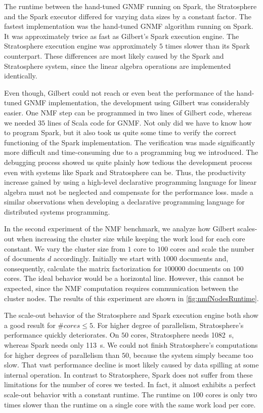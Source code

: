 The runtime between the hand-tuned GNMF running on Spark, the Stratosphere and the Spark executor differed for varying data sizes by a constant factor.
The fastest implementation was the hand-tuned GNMF algorithm running on Spark.
It was approximately twice as fast as Gilbert's Spark execution engine.
The Stratosphere execution engine was approximately $5$ times slower than its Spark counterpart.
These differences are most likely caused by the Spark and Stratosphere system, since the linear algebra operations are implemented identically.

Even though, Gilbert could not reach or even beat the performance of the hand-tuned GNMF implementation, the development using Gilbert was considerably easier.
One NMF step can be programmed in two lines of Gilbert code, whereas we needed $35$ lines of Scala code for GNMF.
Not only did we have to know how to program Spark, but it also took us quite some time to verify the correct functioning of the Spark implementation.
The verification was made significantly more difficult and time-consuming due to a programming bug we introduced.
The debugging process showed us quite plainly how tedious the development process even with systems like Spark and Stratosphere can be.
Thus, the productivity increase gained by using a high-level declarative programming language for linear algebra must not be neglected and compensate for the performance loss.
\Textcite{alvaro:2010a} made a similar observations when developing a declarative programming language for distributed systems programming.

In the second experiment of the NMF benchmark, we analyze how Gilbert scales-out when increasing the cluster size while keeping the work load for each core constant.
We vary the cluster size from $1$ core to $100$ cores and scale the number of documents $d$ accordingly.
Initially we start with $1000$ documents and, consequently, calculate the matrix factorization for $100000$ documents on $100$ cores.
The ideal behavior would be a horizontal line.
However, this cannot be expected, since the NMF computation requires communication between the cluster nodes.
The results of this experiment are shown in \cref{fig:nmfNodesRuntime}.

The scale-out behavior of the Stratosphere and Spark execution engine both show a good result for $\#cores \le 5$.
For higher degree of parallelism, Stratosphere's performance quickly deteriorates.
On $50$ cores, Stratosphere needs \SI{1082}{\second}, whereas Spark needs only \SI{113}{\second}.
We could not finish Stratosphere's computations for higher degrees of parallelism than $50$, because the system simply became too slow.
That vast performance decline is most likely caused by data spilling at some internal operation.
In contrast to Stratosphere, Spark does not suffer from these limitations for the number of cores we tested.
In fact, it almost exhibits a perfect scale-out behavior with a constant runtime.
The runtime on $100$ cores is only two times slower than the runtime on a single core with the same work load per core.

